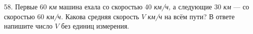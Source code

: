 58. Первые 60 {\it км} машина ехала со скоростью 40 {\it км/ч,} а следующие 30 {\it км} --- со скоростью 60 {\it км/ч.} Какова средняя скорость $V$ {\it км/ч} на всём пути? В ответе напишите число $V$ без единиц измерения.\\

